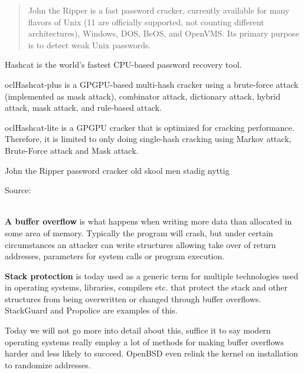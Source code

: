 \documentclass[Screen16to9,17pt]{foils}
\begin{document}


\begin{quote}
John the Ripper is a fast password cracker, currently available for
many flavors of Unix (11 are officially supported, not counting
different architectures), Windows, DOS, BeOS, and OpenVMS. Its primary
purpose is to detect weak Unix passwords.
\end{quote}

\begin{list2}
\item Hashcat is the world's fastest CPU-based password recovery tool.
\item oclHashcat-plus is a GPGPU-based multi-hash cracker using a brute-force attack (implemented as mask attack), combinator attack, dictionary attack, hybrid attack, mask attack, and rule-based attack.
\item oclHashcat-lite is a GPGPU cracker that is optimized for cracking performance. Therefore, it is limited to only doing single-hash cracking using Markov attack, Brute-Force attack and Mask attack.
\item John the Ripper password cracker old skool men stadig nyttig
\end{list2}

Source:\\
\\





\begin{list1}
\item {\bfseries A buffer overflow} is what happens when writing more data than allocated in some area of memory. Typically the program will crash, but under certain circumstances an attacker can write structures allowing take over of return addresses, parameters for system calls or program execution.
\item {\bfseries Stack protection} is today used as a generic term for multiple technologies used in operating systems, libraries, compilers etc. that protect the stack and other structures from being overwritten or changed through buffer overflows. StackGuard
and Propolice are examples of this.
\end{list1}

Today we will not go more into detail about this, suffice it to say modern operating systems really employ a lot of methods for making buffer overflows harder and less likely to succeed. OpenBSD even relink the kernel on installation to randomize addresses.
\end{document}
